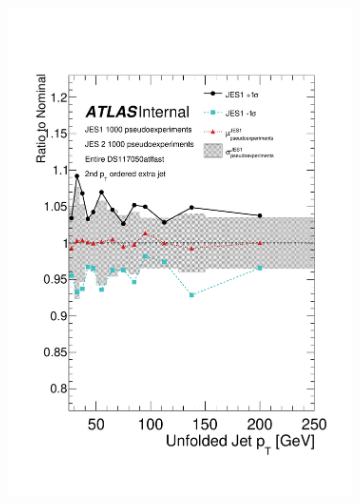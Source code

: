 \begin{figure}
\begin{subfigure}[]{0.45\textwidth}
\includegraphics[width=\textwidth]{fig/UnfoldSys/Toy/JES1VarBandRatioJet1.pdf}
\end{subfigure} \\
\begin{subfigure}[]{0.45\textwidth}

\end{subfigure}
\end{figure}
